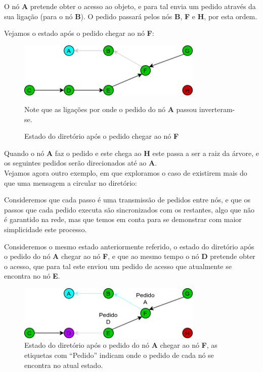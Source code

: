O nó \textbf{A} pretende obter o acesso ao objeto, e para tal envia um pedido através da sua ligação (para o nó \textbf{B}).
O pedido passará pelos nós \textbf{B}, \textbf{F} e \textbf{H}, por esta ordem.

Vejamos o estado após o pedido chegar ao nó \textbf{F}:

\begin{figure}[!htb]
\centering
\includegraphics[width=250pt]{um_pedido_2.png}
\caption{Estado do diretório após o pedido chegar ao nó \textbf{F}}
Note que as ligações por onde o pedido do nó \textbf{A} passou inverteram-se.

\end{figure}


Quando o nó \textbf{A} faz o pedido e este chega ao \textbf{H} este passa a ser a raiz da árvore, e os seguintes pedidos serão direcionados até ao \textbf{A}.\\



Vejamos agora outro exemplo, em que exploramos o caso de existirem mais do que uma mensagem a circular no diretório:

Consideremos que cada passo é uma transmissão de pedidos entre nós, e que os passos que cada pedido executa são sincronizados com os restantes, algo que não é garantido na rede, mas que temos em conta para se demonstrar com maior simplicidade este processo.

Consideremos o mesmo estado anteriormente referido, o estado do diretório após o pedido do nó \textbf{A} chegar ao nó \textbf{F}, e que ao mesmo tempo o nó \textbf{D} pretende obter o acesso, que para tal este enviou um pedido de acesso que atualmente se encontra no nó \textbf{E}.


\begin{figure}[!htb]
\centering
\includegraphics[width=250pt]{dois_pedidos_1.png}
\caption{Estado do diretório após o pedido do nó \textbf{A} chegar ao nó \textbf{F}, as etiquetas com ``Pedido'' indicam onde o pedido de cada nó se encontra no atual estado.}

\end{figure}

